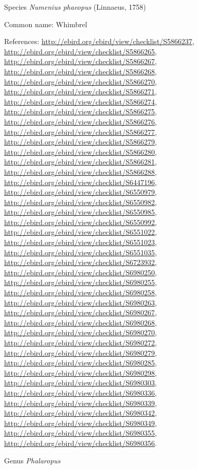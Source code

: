 \documentclass[9pt, article]{memoir}
\begin{document}
\begin{multicols}{2}
\vspace{6pt}\noindent\hspace{36pt}Species \textit{Numenius phaeopus} (Linnaeus, 1758)


Common name: Whimbrel

References: 
\url{http://ebird.org/ebird/view/checklist/S5866237}, 
\url{http://ebird.org/ebird/view/checklist/S5866265}, 
\url{http://ebird.org/ebird/view/checklist/S5866267}, 
\url{http://ebird.org/ebird/view/checklist/S5866268}, 
\url{http://ebird.org/ebird/view/checklist/S5866270}, 
\url{http://ebird.org/ebird/view/checklist/S5866271}, 
\url{http://ebird.org/ebird/view/checklist/S5866274}, 
\url{http://ebird.org/ebird/view/checklist/S5866275}, 
\url{http://ebird.org/ebird/view/checklist/S5866276}, 
\url{http://ebird.org/ebird/view/checklist/S5866277}, 
\url{http://ebird.org/ebird/view/checklist/S5866279}, 
\url{http://ebird.org/ebird/view/checklist/S5866280}, 
\url{http://ebird.org/ebird/view/checklist/S5866281}, 
\url{http://ebird.org/ebird/view/checklist/S5866288}, 
\url{http://ebird.org/ebird/view/checklist/S6447196}, 
\url{http://ebird.org/ebird/view/checklist/S6550979}, 
\url{http://ebird.org/ebird/view/checklist/S6550982}, 
\url{http://ebird.org/ebird/view/checklist/S6550985}, 
\url{http://ebird.org/ebird/view/checklist/S6550992}, 
\url{http://ebird.org/ebird/view/checklist/S6551022}, 
\url{http://ebird.org/ebird/view/checklist/S6551023}, 
\url{http://ebird.org/ebird/view/checklist/S6551035}, 
\url{http://ebird.org/ebird/view/checklist/S6723932}, 
\url{http://ebird.org/ebird/view/checklist/S6980250}, 
\url{http://ebird.org/ebird/view/checklist/S6980255}, 
\url{http://ebird.org/ebird/view/checklist/S6980258}, 
\url{http://ebird.org/ebird/view/checklist/S6980263}, 
\url{http://ebird.org/ebird/view/checklist/S6980267}, 
\url{http://ebird.org/ebird/view/checklist/S6980268}, 
\url{http://ebird.org/ebird/view/checklist/S6980270}, 
\url{http://ebird.org/ebird/view/checklist/S6980272}, 
\url{http://ebird.org/ebird/view/checklist/S6980279}, 
\url{http://ebird.org/ebird/view/checklist/S6980285}, 
\url{http://ebird.org/ebird/view/checklist/S6980298}, 
\url{http://ebird.org/ebird/view/checklist/S6980303}, 
\url{http://ebird.org/ebird/view/checklist/S6980336}, 
\url{http://ebird.org/ebird/view/checklist/S6980339}, 
\url{http://ebird.org/ebird/view/checklist/S6980342}, 
\url{http://ebird.org/ebird/view/checklist/S6980349}, 
\url{http://ebird.org/ebird/view/checklist/S6980355}, 
\url{http://ebird.org/ebird/view/checklist/S6980356}.

\vspace{6pt}\noindent\hspace{30pt}Genus \textit{Phalaropus}



\end{multicols}
\end{document}
